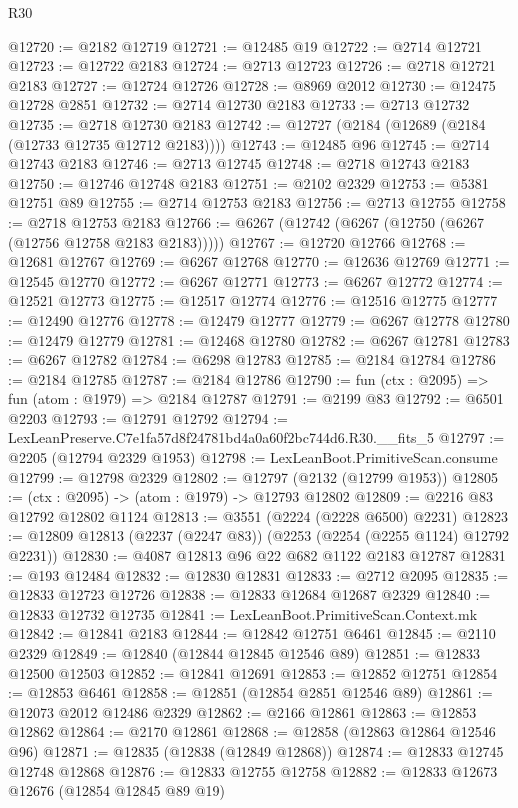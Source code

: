 \begin{lexlean}{R30}
\begin{coremodule}
@12720 := @2182 @12719
@12721 := @12485 @19
@12722 := @2714 @12721
@12723 := @12722 @2183
@12724 := @2713 @12723
@12726 := @2718 @12721 @2183
@12727 := @12724 @12726
@12728 := @8969 @2012
@12730 := @12475 @12728 @2851
@12732 := @2714 @12730 @2183
@12733 := @2713 @12732
@12735 := @2718 @12730 @2183
@12742 := @12727 (@2184 (@12689 (@2184 (@12733 @12735 @12712 @2183))))
@12743 := @12485 @96
@12745 := @2714 @12743 @2183
@12746 := @2713 @12745
@12748 := @2718 @12743 @2183
@12750 := @12746 @12748 @2183
@12751 := @2102 @2329
@12753 := @5381 @12751 @89
@12755 := @2714 @12753 @2183
@12756 := @2713 @12755
@12758 := @2718 @12753 @2183
@12766 := @6267 (@12742 (@6267 (@12750 (@6267 (@12756 @12758 @2183 @2183)))))
@12767 := @12720 @12766
@12768 := @12681 @12767
@12769 := @6267 @12768
@12770 := @12636 @12769
@12771 := @12545 @12770
@12772 := @6267 @12771
@12773 := @6267 @12772
@12774 := @12521 @12773
@12775 := @12517 @12774
@12776 := @12516 @12775
@12777 := @12490 @12776
@12778 := @12479 @12777
@12779 := @6267 @12778
@12780 := @12479 @12779
@12781 := @12468 @12780
@12782 := @6267 @12781
@12783 := @6267 @12782
@12784 := @6298 @12783
@12785 := @2184 @12784
@12786 := @2184 @12785
@12787 := @2184 @12786
@12790 := fun (ctx : @2095) => fun (atom : @1979) => @2184 @12787
@12791 := @2199 @83
@12792 := @6501 @2203
@12793 := @12791 @12792
@12794 := LexLeanPreserve.C7e1fa57d8f24781bd4a0a60f2bc744d6.R30.__fits_5
@12797 := @2205 (@12794 @2329 @1953)
@12798 := LexLeanBoot.PrimitiveScan.consume
@12799 := @12798 @2329
@12802 := @12797 (@2132 (@12799 @1953))
@12805 := (ctx : @2095) -> (atom : @1979) -> @12793 @12802
@12809 := @2216 @83 @12792 @12802 @1124
@12813 := @3551 (@2224 (@2228 @6500) @2231)
@12823 := @12809 @12813 (@2237 (@2247 @83)) (@2253 (@2254 (@2255 @1124) @12792 @2231))
@12830 := @4087 @12813 @96 @22 @682 @1122 @2183 @12787
@12831 := @193 @12484
@12832 := @12830 @12831
@12833 := @2712 @2095
@12835 := @12833 @12723 @12726
@12838 := @12833 @12684 @12687 @2329
@12840 := @12833 @12732 @12735
@12841 := LexLeanBoot.PrimitiveScan.Context.mk
@12842 := @12841 @2183
@12844 := @12842 @12751 @6461
@12845 := @2110 @2329
@12849 := @12840 (@12844 @12845 @12546 @89)
@12851 := @12833 @12500 @12503
@12852 := @12841 @12691
@12853 := @12852 @12751
@12854 := @12853 @6461
@12858 := @12851 (@12854 @2851 @12546 @89)
@12861 := @12073 @2012 @12486 @2329
@12862 := @2166 @12861
@12863 := @12853 @12862
@12864 := @2170 @12861
@12868 := @12858 (@12863 @12864 @12546 @96)
@12871 := @12835 (@12838 (@12849 @12868))
@12874 := @12833 @12745 @12748 @12868
@12876 := @12833 @12755 @12758
@12882 := @12833 @12673 @12676 (@12854 @12845 @89 @19)

\end{coremodule}
\end{lexlean}
